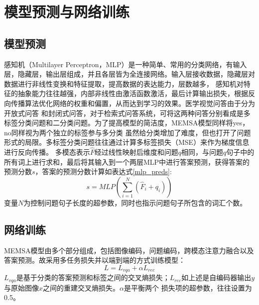 \section{模型预测与网络训练}
\subsection{模型预测}
感知机（Multilayer Perceptron，MLP）是一种简单、常用的分类网络，有输入层，隐藏层，输出层组成，并且各层皆为全连接网络。输入层接收数据，隐藏层对数据进行非线性变换和特征提取，提高数据的表达能力，层数越多，
感知机对特征的抽象能力往往越强，内部非线性由激活函数激活，最后计算输出损失，根据反向传播算法优化网络的权重和偏置，从而达到学习的效果。医学视觉问答由于分为开放式问答
和封闭式问答，对于检索式问答系统，可将这两种问答分别看成是多标签分类问题和二分类问题。为了提高模型的简洁度，MEMSA模型同样将yes，no同样视为两个独立的标签参与多分类
虽然给分类增加了难度，但也打开了问题形式的局限。多标签分类问题往往通过计算多标签损失（MSE）来作为梯度信息进行反向传播。
多模态表示$\hat{F}$经过线性映射后维度和问题$q$相同，与问题$q$句子中的所有词上进行求和，最后将其输入到一个两层MLP中进行答案预测，获得答案的预测分数$s$，答案的预测分数计算如表达式\eqref{mlp_preds}:
\begin{equation}
	\label{mlp_preds}
	s=M L P\left(\sum_{i=1}^{N}\left(\hat{F}_i+q_i\right)\right) 
\end{equation}
变量$N$为控制问题句子长度的超参数，同时也指示问题句子所包含的词汇个数。

\subsection{网络训练}
MEMSA模型由多个部分组成，包括图像编码，问题编码，跨模态注意力融合以及答案预测。故采用多任务损失并以端到端的方式训练模型：
\begin{equation}
	\label{}
	L=L_{vqa}+\alpha L_{rec} 
\end{equation}
$L_{vqa}$是基于分类的答案预测和标签之间的交叉熵损失；$L_{rec}$如上述是自编码器输出$y$与原始图像$x$之间的重建交叉熵损失。$\alpha$是平衡两个
损失项的超参数，往往设置为0.5。
